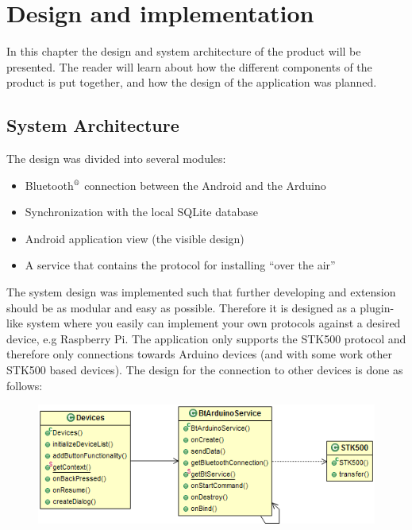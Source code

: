 \chapter{Design and implementation}
In this chapter the design and system architecture of the product will be presented. The reader will learn about how the different components of the product is put together, and how the design of the application was planned.

\section{System Architecture}
	The design was divided into several modules:
	\begin{itemize}
		\item{Bluetooth$\textsuperscript{\textregistered}$ connection between the Android and the Arduino}
		\item{Synchronization with the local SQLite database}
		\item{Android application view (the visible design)}
		\item{A service that contains the protocol for installing ``over the air''}
	\end{itemize}
	\vspace{0.2in}
	
	The system design was implemented such that further developing and extension should be as modular and easy as possible.
	Therefore it is designed as a plugin-like system where you easily can implement your own protocols against a desired device, e.g Raspberry Pi. The application only supports the STK500 protocol and therefore only connections towards Arduino devices (and with some work other STK500 based devices).
	The design for the connection to other devices is done as follows:\\

	\begin{figure}[H]
	\centering
	\includegraphics[width=130mm]{images/BTConnection.png}
	\end{figure}

